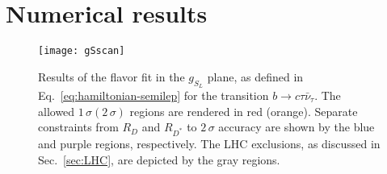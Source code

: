 \documentclass[aps,prd,superscriptaddress,twocolumn,secnumarabic]{revtex4-1}
\begin{document}
\section{Numerical results}
\label{sec:num}


\begin{figure}[!b]
  \centering
  \texttt{[image: gSscan]}
  \caption{Results of the flavor fit in the $g_{S_L}$ plane, as defined in Eq.~\ref{eq:hamiltonian-semilep} for the transition $b\to c\tau \bar{\nu}_\tau$. The allowed $1\,\sigma (2\,\sigma)$ regions are rendered in red (orange). Separate constraints from $R_D$ and $R_{D^\ast}$ to $2\,\sigma$ accuracy are shown by the blue and purple regions, respectively. The LHC exclusions, as discussed in Sec.~\ref{sec:LHC}, are depicted by the gray regions.
  \label{fig:gSplotRDst}}
\end{figure}
\end{document}
